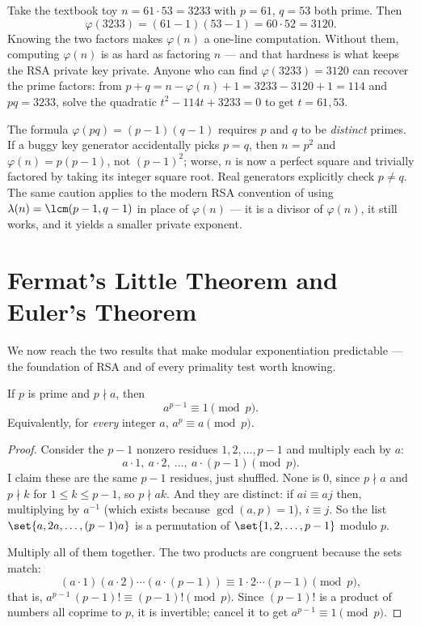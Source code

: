 \begin{example}
\label{ch04:ex-totient-rsa}
Take the textbook toy $n = 61 \cdot 53 = 3233$ with $p = 61$, $q = 53$ both prime. Then
\[
  \varphi(3233) = (61 - 1)(53 - 1) = 60 \cdot 52 = 3120.
\]
Knowing the two factors makes $\varphi(n)$ a one-line computation. Without them, computing
$\varphi(n)$ is as hard as factoring $n$ --- and that hardness is what keeps the RSA private key
private. Anyone who can find $\varphi(3233) = 3120$ can recover the prime factors: from
$p + q = n - \varphi(n) + 1 = 3233 - 3120 + 1 = 114$ and $pq = 3233$, solve the quadratic
$t^2 - 114 t + 3233 = 0$ to get $t = 61, 53$.
\end{example}

\begin{trapbox}
The formula $\varphi(pq) = (p-1)(q-1)$ requires $p$ and $q$ to be \emph{distinct} primes. If a buggy
key generator accidentally picks $p = q$, then $n = p^2$ and $\varphi(n) = p(p-1)$, not $(p-1)^2$;
worse, $n$ is now a perfect square and trivially factored by taking its integer square root. Real
generators explicitly check $p \neq q$. The same caution applies to the modern RSA convention of
using $\lambda(n) = \lcm(p-1, q-1)$ in place of $\varphi(n)$ --- it is a divisor of $\varphi(n)$, it
still works, and it yields a smaller private exponent.
\end{trapbox}

\section{Fermat's Little Theorem and Euler's Theorem}
\label{ch04:fermat-euler}

We now reach the two results that make modular exponentiation predictable --- the foundation of
RSA and of every primality test worth knowing.

\begin{theorem}
\label{ch04:thm-flt}
If $p$ is prime and $p \nmid a$, then
\[
  a^{p-1} \equiv 1 \pmod p.
\]
Equivalently, for \emph{every} integer $a$, $a^p \equiv a \pmod p$.
\end{theorem}

\begin{proof}
Consider the $p - 1$ nonzero residues $1, 2, \dots, p-1$ and multiply each by $a$:
\[
  a \cdot 1,\ a \cdot 2,\ \dots,\ a \cdot (p-1) \pmod p.
\]
I claim these are the same $p-1$ residues, just shuffled. None is $0$, since $p \nmid a$ and
$p \nmid k$ for $1 \le k \le p-1$, so $p \nmid ak$. And they are distinct: if $ai \equiv aj$ then,
multiplying by $a^{-1}$ (which exists because $\gcd(a,p)=1$), $i \equiv j$. So the list
$\set{a, 2a, \dots, (p-1)a}$ is a permutation of $\set{1, 2, \dots, p-1}$ modulo $p$.

Multiply all of them together. The two products are congruent because the sets match:
\[
  (a \cdot 1)(a \cdot 2)\cdots(a \cdot (p-1)) \equiv 1 \cdot 2 \cdots (p-1) \pmod p,
\]
that is, $a^{p-1}\,(p-1)! \equiv (p-1)! \pmod p$. Since $(p-1)!$ is a product of numbers all coprime
to $p$, it is invertible; cancel it to get $a^{p-1} \equiv 1 \pmod p$.
\end{proof}

